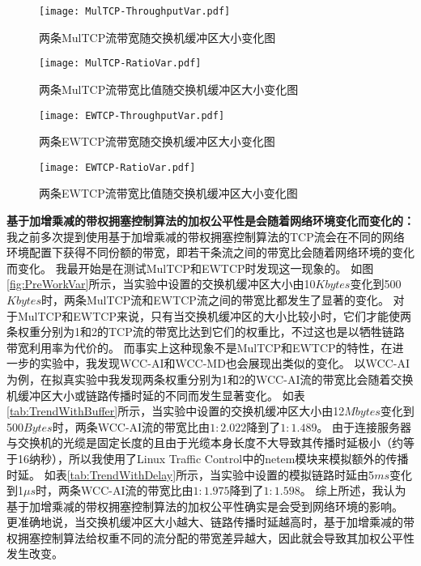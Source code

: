 \documentclass[winfonts]{njuthesis}
\begin{document}
\begin{figure*}[ht]
  \begin{subfigure}{.5\textwidth}
    \centering
		\texttt{[image: MulTCP-ThroughputVar.pdf]}
    \label{fig:MulTCP-ThroughputVar}
    \caption{两条MulTCP流带宽随交换机缓冲区大小变化图}
  \end{subfigure}
	\begin{subfigure}{.5\textwidth}
    \centering
		\texttt{[image: MulTCP-RatioVar.pdf]}
    \label{fig:MulTCP-RatioVar}
    \caption{两条MulTCP流带宽比值随交换机缓冲区大小变化图}
  \end{subfigure}	
	\begin{subfigure}{.5\textwidth}
    \centering
		\texttt{[image: EWTCP-ThroughputVar.pdf]}
    \label{fig:EWTCP-ThroughputVar}
    \caption{两条EWTCP流带宽随交换机缓冲区大小变化图}
  \end{subfigure}
	\begin{subfigure}{.5\textwidth}
    \centering
		\texttt{[image: EWTCP-RatioVar.pdf]}
    \label{fig:EWTCP-RatioVar}
    \caption{两条EWTCP流带宽比值随交换机缓冲区大小变化图}
  \end{subfigure}
	\caption{权重分别为1和2的两条MulTCP和EWTCP流的带宽及其比值随交换机缓冲区大小变化图。}
	\label{fig:PreWorkVar}
\end{figure*}

\textbf{基于加增乘减的带权拥塞控制算法的加权公平性是会随着网络环境变化而变化的：}
我之前多次提到使用基于加增乘减的带权拥塞控制算法的TCP流会在不同的网络环境配置下获得不同份额的带宽，即若干条流之间的带宽比会随着网络环境的变化而变化。
我最开始是在测试MulTCP和EWTCP时发现这一现象的。
如图\ref{fig:PreWorkVar}所示，当实验中设置的交换机缓冲区大小由10$Kbytes$变化到500$Kbytes$时，两条MulTCP流和EWTCP流之间的带宽比都发生了显著的变化。
对于MulTCP和EWTCP来说，只有当交换机缓冲区的大小比较小时，它们才能使两条权重分别为1和2的TCP流的带宽比达到它们的权重比，不过这也是以牺牲链路带宽利用率为代价的。
而事实上这种现象不是MulTCP和EWTCP的特性，在进一步的实验中，我发现WCC-AI和WCC-MD也会展现出类似的变化。
以WCC-AI为例，在拟真实验中我发现两条权重分别为1和2的WCC-AI流的带宽比会随着交换机缓冲区大小或链路传播时延的不同而发生显著变化。
如表\ref{tab:TrendWithBuffer}所示，当实验中设置的交换机缓冲区大小由12$Mbytes$变化到500$Bytes$时，两条WCC-AI流的带宽比由$1:2.022$降到了$1:1.489$。
由于连接服务器与交换机的光缆是固定长度的且由于光缆本身长度不大导致其传播时延极小（约等于16纳秒），所以我使用了Linux Traffic Control中的netem模块来模拟额外的传播时延。
如表\ref{tab:TrendWithDelay}所示，当实验中设置的模拟链路时延由5$ms$变化到1$\mu s$时，两条WCC-AI流的带宽比由$1:1.975$降到了$1:1.598$。
综上所述，我认为基于加增乘减的带权拥塞控制算法的加权公平性确实是会受到网络环境的影响。
更准确地说，当交换机缓冲区大小越大、链路传播时延越高时，基于加增乘减的带权拥塞控制算法给权重不同的流分配的带宽差异越大，因此就会导致其加权公平性发生改变。
\end{document}
